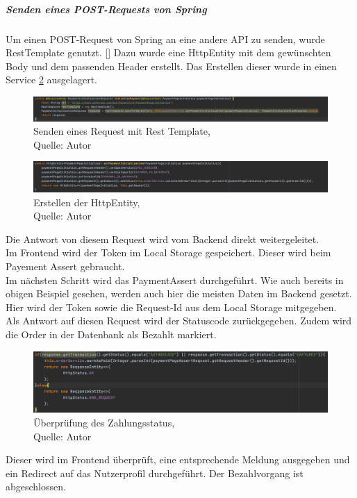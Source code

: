\subparagraph{Senden eines POST-Requests von Spring}\label{postSpring}
Um einen POST-Request von Spring an eine andere API zu senden, wurde RestTemplate genutzt. [\cite{restTemplate}] Dazu wurde eine HttpEntity mit dem gewünschten Body und dem passenden Header erstellt. Das Erstellen dieser wurde in einen Service \ref{img: httpEntity} ausgelagert. 
\begin{figure}[H]
	\includegraphics[width=1\textwidth]{images/restTemplate.PNG}
	\caption[Senden eines Request mit Rest Template]{Senden eines Request mit Rest Template,\\ Quelle: Autor}
	\label{img: restTemplate}
\end{figure}
\begin{figure}[H]
	\includegraphics[width=1\textwidth]{images/httpEntity.PNG}
	\caption[Erstellen der HttpEntity]{Erstellen der HttpEntity,\\ Quelle: Autor}
	\label{img: httpEntity}
\end{figure}

Die Antwort von diesem Request wird vom Backend direkt weitergeleitet. \\Im Frontend wird der Token im Local Storage gespeichert. Dieser wird beim Payement Assert gebraucht.
\\
Im nächsten Schritt wird das PaymentAssert durchgeführt. Wie auch bereits in obigen Beispiel gesehen, werden auch hier die meisten Daten im Backend gesetzt. Hier wird der Token sowie die Request-Id aus dem Local Storage mitgegeben. \\
Als Antwort auf diesen Request wird der Statuscode zurückgegeben. Zudem wird die Order in der Datenbank als Bezahlt markiert. 
 \begin{figure}[H]
	\centering
	\includegraphics[width=1\textwidth]{images/pageAssertReturn.PNG}
	\caption[Überprüfung des Zahlungsstatus]{Überprüfung des Zahlungsstatus,\\ Quelle: Autor}
	\label{img: pageAssertReturn}
\end{figure} 
Dieser wird im Frontend überprüft, eine entsprechende Meldung ausgegeben und ein Redirect auf das Nutzerprofil durchgeführt. Der Bezahlvorgang ist abgeschlossen.  

